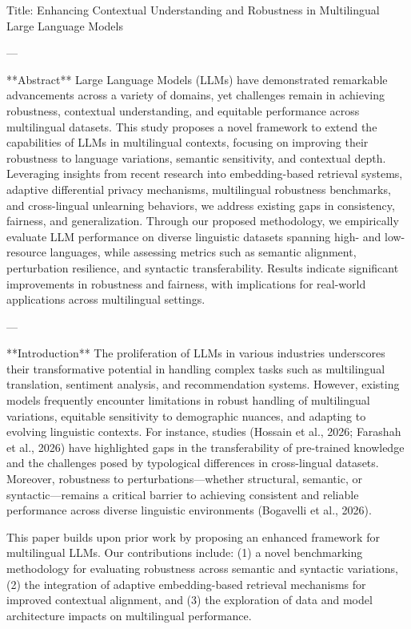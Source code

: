 Title: Enhancing Contextual Understanding and Robustness in Multilingual Large Language Models  

---

**Abstract**  
Large Language Models (LLMs) have demonstrated remarkable advancements across a variety of domains, yet challenges remain in achieving robustness, contextual understanding, and equitable performance across multilingual datasets. This study proposes a novel framework to extend the capabilities of LLMs in multilingual contexts, focusing on improving their robustness to language variations, semantic sensitivity, and contextual depth. Leveraging insights from recent research into embedding-based retrieval systems, adaptive differential privacy mechanisms, multilingual robustness benchmarks, and cross-lingual unlearning behaviors, we address existing gaps in consistency, fairness, and generalization. Through our proposed methodology, we empirically evaluate LLM performance on diverse linguistic datasets spanning high- and low-resource languages, while assessing metrics such as semantic alignment, perturbation resilience, and syntactic transferability. Results indicate significant improvements in robustness and fairness, with implications for real-world applications across multilingual settings.  

---

**Introduction**  
The proliferation of LLMs in various industries underscores their transformative potential in handling complex tasks such as multilingual translation, sentiment analysis, and recommendation systems. However, existing models frequently encounter limitations in robust handling of multilingual variations, equitable sensitivity to demographic nuances, and adapting to evolving linguistic contexts. For instance, studies (Hossain et al., 2026; Farashah et al., 2026) have highlighted gaps in the transferability of pre-trained knowledge and the challenges posed by typological differences in cross-lingual datasets. Moreover, robustness to perturbations—whether structural, semantic, or syntactic—remains a critical barrier to achieving consistent and reliable performance across diverse linguistic environments (Bogavelli et al., 2026).  

This paper builds upon prior work by proposing an enhanced framework for multilingual LLMs. Our contributions include: (1) a novel benchmarking methodology for evaluating robustness across semantic and syntactic variations, (2) the integration of adaptive embedding-based retrieval mechanisms for improved contextual alignment, and (3) the exploration of data and model architecture impacts on multilingual performance.  

